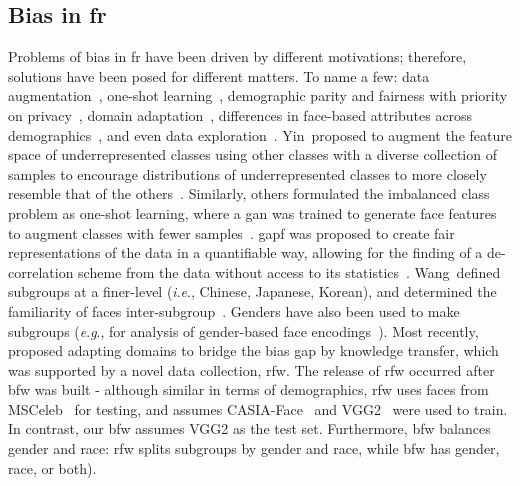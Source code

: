 \documentclass[10pt,twocolumn,letterpaper]{article}
\newcommand{\ie}{\textit{i}.\textit{e}., }
\newcommand{\eg}{\textit{e}.\textit{g}., }
\begin{document}
    \subsection{Bias in \gls{fr}}
        Problems of bias in \gls{fr} have been driven by different motivations; therefore, solutions have been posed for different matters. To name a few: data augmentation~\cite{yin2019feature}, one-shot learning~\cite{ding2018one}, demographic parity and fairness with priority on privacy~\cite{huang2018generative}, domain adaptation~\cite{wang2018racial}, differences in face-based attributes across demographics~\cite{wang2018they}, and even data exploration~\cite{muthukumar2019}. Yin~\etal proposed to augment the feature space of underrepresented classes using other classes with a diverse collection of samples to encourage distributions of underrepresented classes to more closely resemble that of the others~\cite{yin2019feature}. Similarly, others formulated the imbalanced class problem as one-shot learning, where a \gls{gan} was trained to generate face features to augment classes with fewer samples~\cite{ding2018one}. \gls{gapf} was proposed to create fair representations of the data in a quantifiable way, allowing for the finding of a de-correlation scheme from the data without access to its statistics~\cite{huang2018generative}. Wang~\etal defined subgroups at a finer-level (\ie Chinese, Japanese, Korean), and determined the familiarity of faces inter-subgroup~\cite{wang2018they}. Genders have also been used to make subgroups (\eg for analysis of gender-based face encodings~\cite{muthukumar2019}). Most recently,~\cite{wang2018racial} proposed adapting domains to bridge the bias gap by knowledge transfer, which was supported by a novel data collection, \gls{rfw}. The release of \gls{rfw} occurred after \gls{bfw} was built - although similar in terms of demographics, \gls{rfw} uses faces from MSCeleb~\cite{guo2016ms} for testing, and assumes CASIA-Face~\cite{yi2014learning} and VGG2~\cite{Cao18} were used to train. In contrast, our \gls{bfw} assumes VGG2 as the test set. 
        Furthermore, \gls{bfw} balances gender and race: \gls{rfw} splits subgroups by gender and race, while \gls{bfw} has gender, race, or both). 
\end{document}

